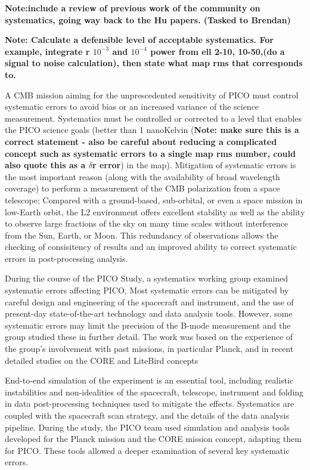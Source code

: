 \documentclass[PICOReport.tex]{subfiles}
\begin{document}
\textbf{Note:include a review of previous work of the community on
  systematics, going way back to the Hu papers. (Tasked to Brendan)}

\textbf{Note: Calculate a defensible level of acceptable systematics.
For example, integrate r $10^{-3}$ and $10^{-4}$ power from ell 2-10, 10-50,(do a signal to
noise calculation), then state what map rms that corresponds to.  }

A CMB mission aiming for the unprescedented sensitivity of PICO must control
systematic errors to avoid bias or an increased variance of the
science measurement.   
Systematics must be controlled or corrected to a level that enables the PICO
science goals (better than 1 nanoKelvin (\textbf{Note: make sure this is a
  correct statement - also be careful about reducing a complicated
  concept such as systematic errors to a single map rms number, could also
  quote this as a $\delta$r error}) in the map).
Mitigation of systematic errors is the most important reason (along
with the availability of broad wavelength coverage) to perform a
measurement of the CMB polarization from a space telescope; Compared
with a ground-based, sub-orbital, or even a space mission in 
low-Earth orbit, the L2 environment offers excellent stability as well
as the ability to observe large fractions of the sky on many time
scales without interference from the Sun, Earth, or Moon.
This redundancy of observations allows the checking of consisitency of
results and an improved ability to correct systematic errors in
post-processing analysis.

During the course of the PICO Study, a systematics working group
examined systematic errors affecting PICO,
Most  systematic errors can be mitigated by careful design and engineering of 
the spacecraft and instrument, and the use of present-day state-of-the-art
technology and data analysis tools.   
However, some systematic errors may
limit the precision of the B-mode measurement and the group studied
these in further detail. 
The work was based on the experience of the group's involvement with
past missions, in particular Planck, and in recent detailed studies on
the CORE and LiteBird  concepts

End-to-end simulation of the experiment is an essential tool,
including realistic instabilities and non-idealities of the spacecraft,
telescope, instrument and folding in data post-processing techniques
used to mitigate the effects.  Systematics are coupled with the
spacecraft scan strategy, and the details of the 
data analysis pipeline.  During the study, the PICO team used 
 simulation and analysis tools developed for the Planck mission\cite{plank2015_xii_focalplane} and 
the CORE mission concept, adapting them for PICO.  These tools allowed
a deeper examination of several key systematic errors. 
\end{document}
